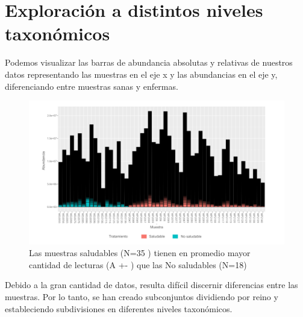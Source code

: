 \section{Exploración a distintos niveles taxonómicos}
Podemos visualizar las barras de abundancia absolutas y relativas de nuestros datos representando las muestras en el eje x y las abundancias en el eje y, diferenciando entre muestras sanas y enfermas.\\
\begin{figure}[h]
\centering
\includegraphics[width=\textwidth]{Img/cap2/Barras.png}
\caption{Las muestras saludables (N=35 ) tienen en promedio mayor cantidad de lecturas (A +- ) que las No saludables (N=18)}
\end{figure}
Debido a la gran cantidad de datos, resulta difícil discernir diferencias entre las muestras. Por lo tanto, se han creado subconjuntos dividiendo por reino y estableciendo subdivisiones en diferentes niveles taxonómicos.\\

